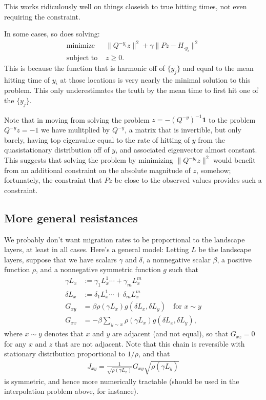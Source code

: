 \documentclass{article}
\newcommand{\bone}{\mathbf{1}}
\begin{document}
This works ridiculously well on things closeish to true hitting times,
not even requiring the constraint.

In some cases, so does solving:
\begin{align}
    \text{minimize } & \| Q^{-y_i} z \|^2 + \gamma \| Pz - H_{\cdot y_i} \|^2 \\
    \text{subject to } &  z \ge 0 .
\end{align}
This is because the function that is harmonic off of $\{y_j\}$
and equal to the mean hitting time of $y_i$ at those locations
is very nearly the minimal solution to this problem.
This only underestimates the truth by the mean time to first hit one of the $\{y_j\}$.

Note that in moving from solving the problem $z = - (Q^{-y})^{-1} \bone$ to the problem $ Q^{-y} z = -1$
we have mulitplied by $Q^{-y}$,
a matrix that is invertible,
but only barely,
having top eigenvalue equal to the rate of hitting of $y$ from the quasistationary distribution off of $y$,
and associated eigenvector almost constant.
This suggests that solving the problem by minimizing $ \| Q^{-y_i} z \|^2$
would benefit from an additional constraint on the absolute magnitude of $z$, somehow;
fortunately, the constraint that $Pz$ be close to the observed values provides such a constraint.


\subsection*{More general resistances}

We probably don't want migration rates to be proportional to the landscape layers,
at least in all cases.
Here's a general model:
Letting $L$ be the landscape layers,
suppose that we have scalars $\gamma$ and $\delta$, 
a nonnegative scalar $\beta$,
a positive function $\rho$, 
and a nonnegative symmetric function $g$ such that
\begin{align}
  \gamma L_x &:= \gamma_1 L^1_x \cdots + \gamma_m L^m_x  \\
  \delta L_x &:= \delta_1 L^1_x \cdots + \delta_m L^m_x  \\
  G_{xy} &= \beta \rho( \gamma L_x ) g( \delta L_x, \delta L_y ) \quad \text{for $x \sim y$} \\
  G_{xx} &= - \beta \sum_{y \sim x} \rho( \gamma L_x ) g( \delta L_x, \delta L_y ) ,
\end{align}
where $x \sim y$ denotes that $x$ and $y$ are adjacent (and not equal),
so that $G_{xz} = 0$ for any $x$ and $z$ that are not adjacent.
Note that this chain is reversible with stationary distribution proportional to $1/\rho$,
and that
\begin{align}
  J_{xy} = \frac{1}{\sqrt{\rho(\gamma L_x)}} G_{xy} \sqrt{ \rho(\gamma L_y) }
\end{align}
is symmetric, and hence more numerically tractable (should be used in the interpolation problem above, for instance).
\end{document}
